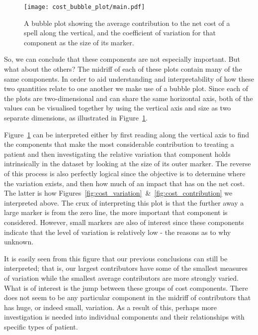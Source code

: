 \begin{figure}[h]
    \centering
    \texttt{[image: cost\_bubble\_plot/main.pdf]}
    \caption{A bubble plot showing the average contribution to the net cost of a
    spell along the vertical, and the coefficient of variation for that
    component as the size of its marker.}\label{fig:cost_bubble_plot}
\end{figure}

So, we can conclude that these components are not especially important. But what
about the others? The midriff of each of these plots contain many of the same
components. In order to aid understanding and interpretability of how these two
quantities relate to one another we make use of a bubble plot. Since each of the
plots are two-dimensional and can share the same horizontal axis, both of the
values can be visualised together by using the vertical axis and size as two
separate dimensions, as illustrated in Figure~\ref{fig:cost_bubble_plot}.

Figure~\ref{fig:cost_bubble_plot} can be interpreted either by first reading
along the vertical axis to find the components that make the most considerable
contribution to treating a patient and then investigating the relative variation
that component holds intrinsically in the dataset by looking at the size of its
outer marker. The reverse of this process is also perfectly logical since the
objective is to determine where the variation exists, and then how much of an
impact that has on the net cost. The latter is how
Figures~\ref{fig:cost_variation}~\&~\ref{fig:cost_contribution} we interpreted
above. The crux of interpreting this plot is that the further away a large
marker is from the zero line, the more important that component is considered.
However, small markers are also of interest since these components indicate that
the level of variation is relatively low \-- the reasons as to why unknown.

It is easily seen from this figure that our previous conclusions can still be
interpreted; that is, our largest contributors have some of the smallest
measures of variation while the smallest average contributors are more strongly
varied. What is of interest is the jump between these groups of cost components.
There does not seem to be any particular component in the midriff of
contributors that has huge, or indeed small, variation. As a result of this,
perhaps more investigation is needed into individual components and their
relationships with specific types of patient.

